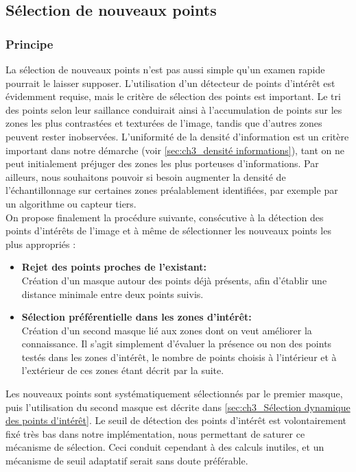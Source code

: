 \subsection{Sélection de nouveaux points} \label{sec:ch3_Sélection des points d'intérêt}
\subsubsection{Principe}
La sélection de nouveaux points n'est pas aussi simple qu'un examen rapide pourrait le laisser supposer. L'utilisation d'un détecteur de points d'intérêt est évidemment requise, mais le critère de sélection des points est important. Le tri des points selon leur saillance conduirait ainsi à l'accumulation de points sur les zones les plus contrastées et texturées de l'image, tandis que d'autres zones peuvent rester inobservées. L'uniformité de la densité d'information est un critère important dans notre démarche (voir \ref{sec:ch3_densité informations}), tant on ne peut initialement préjuger des zones les plus porteuses d'informations. Par ailleurs, nous souhaitons pouvoir si besoin augmenter la densité de l'échantillonnage sur certaines zones préalablement identifiées, par exemple par un algorithme ou capteur tiers. \\

On propose finalement la procédure suivante, consécutive à la détection des points d'intérêts de l'image et à même de sélectionner les nouveaux points les plus appropriés :
\begin{itemize}
	\item \textbf{Rejet des points proches de l'existant:\\}
	Création d'un masque autour des points déjà présents, afin d'établir une distance minimale entre deux points suivis. \\
	
	\item \textbf{Sélection préférentielle dans les zones d'intérêt:\\} 
	Création d'un second masque lié aux zones dont on veut améliorer la connaissance. Il s'agit simplement d'évaluer la présence ou non des points testés dans les zones d'intérêt, le nombre de points choisis à l'intérieur et à l'extérieur de ces zones étant décrit par la suite.\\
\end{itemize}

Les nouveaux points sont systématiquement sélectionnés par le premier masque, puis l'utilisation du second masque est décrite dans \ref{sec:ch3_Sélection dynamique des points d'intérêt}. Le seuil de détection des points d'intérêt est volontairement fixé très bas dans notre implémentation, nous permettant de \og saturer\fg{} ce mécanisme de sélection. Ceci conduit cependant à des calculs inutiles, et un mécanisme de seuil adaptatif serait sans doute préférable.


